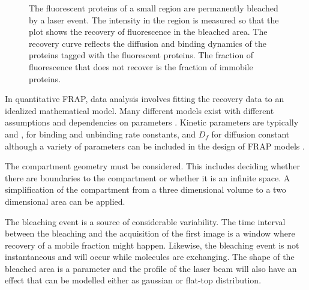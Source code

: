 \begin{figure}

                   {The fluorescent proteins of a small region are
                    permanently bleached by a laser event. The
                    intensity in the region is measured so that the
                    plot shows the recovery of fluorescence in the
                    bleached area.  The recovery curve reflects the
                    diffusion and binding dynamics of the proteins
                    tagged with the fluorescent proteins.  The
                    fraction of fluorescence that does not recover is
                    the fraction of immobile proteins.}
      \label{fig:intro:frap-curve-example}
    \end{figure}

    In quantitative FRAP, data analysis involves fitting the recovery
    data to an idealized mathematical model.
    Many different models exist with different assumptions
    and dependencies on
    parameters \citep{mcnally-frap-2010}.
    Kinetic parameters are typically \Kon{} and \Koff{}, for
    binding and unbinding rate constants, and $D_{f}$ for diffusion
    constant
    although a variety of parameters can be included in
    the design of FRAP models \citep{mcnally-frap-2010}.

    The compartment geometry must be considered.  This includes
    deciding whether there are boundaries to the compartment or
    whether it is an infinite space.  A simplification of the
    compartment from a three dimensional volume to a two dimensional
    area can be applied.

    The bleaching event is a source of considerable variability.
    The time interval between the bleaching and the acquisition of the
    first image is a window where recovery of a mobile fraction might
    happen.  Likewise, the bleaching event is not
    instantaneous and will occur while molecules are exchanging.
    The shape of the bleached area is a parameter and the
    profile of the laser beam will also have an effect that can be modelled
    either as gaussian or flat-top distribution.

